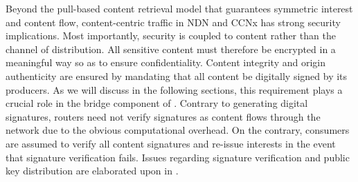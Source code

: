 Beyond the pull-based content retrieval model that guarantees symmetric interest and content flow, content-centric traffic in NDN and CCNx has strong security implications. Most importantly, security is coupled to content rather than the channel of distribution. All sensitive content must therefore be encrypted in a meaningful way so as to ensure confidentiality. Content integrity and origin authenticity are ensured by mandating that all content be digitally signed by its producers. As we will discuss in the following sections, this requirement plays a crucial role in the bridge component of \sink. Contrary to generating digital signatures, routers need not verify signatures as content flows through the network due to the obvious computational overhead. On the contrary, consumers are assumed to verify all content signatures and re-issue interests in the event that signature verification fails. Issues regarding signature verification and public key distribution are elaborated upon in \cite{ghali2014elements}. 

